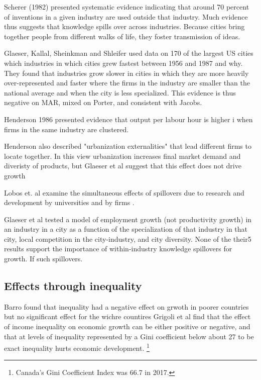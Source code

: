 
Scherer (1982) presented systematic evidence indicating that around 70 percent of inventions in a given industry are used outside that industry. Much evidence thus suggests that knowledge spills over across industries. Because cities bring together people from different walks of life, they foster transmission of ideas.


Glaeser, Kallal, Sheinkman and Shleifer \cite{glaeserGrowthCities1991} used data on 170 of the largest US cities which industries in which cities grew fastest between 1956 and 1987 and why. They found that  industries grow slower in cities in which
they are more heavily over-represented and faster where the firms in the industry are smaller than the national average  and when the city is less specialized. This evidence is
thus negative on MAR, mixed on Porter, and consistent with Jacobs.



Henderson 1986 presented evidence that output per labour hour is higher i when firms in the same industry are clustered.

Henderson also described "urbanization externalities" that lead different firms to locate together. In this view urbanization increases final market demand and diveristy of products, but Glaeser et al suggest that this effect does not drive growth

Lobos et. al examine the simultaneous effects of spillovers due to research and development by universities and by firms \cite{belderbosWhatSpilloversUniversities2022}.

Glaeser et al \cite{glaeserGrowthCities1991} tested a model  of employment growth (not productivity growth) in an industry in a city as a function of the specialization of that industry in that city, local competition in the city-industry, and city diversity. None of the their5 results  support the importance
of within-industry knowledge spillovers for growth. If such spillovers. %

\subsection{Effects through inequality}
Barro \cite{barroInequalityGrowthInvestment1999} found that inequality had a negative effect on grwoth in poorer countries but no significant effect for the wichre countires
Grigoli et al find  that the effect of income inequality on economic growth can be either positive or negative, and that at levels  of inequality  represented by a Gini coefficient below about 27  to be exact inequality hurts economic development. \footnote{Canada's Gini Coefficient Index was 66.7 in 2017.}\cite{grigoliInequalityGrowthHeterogeneous2016} 

